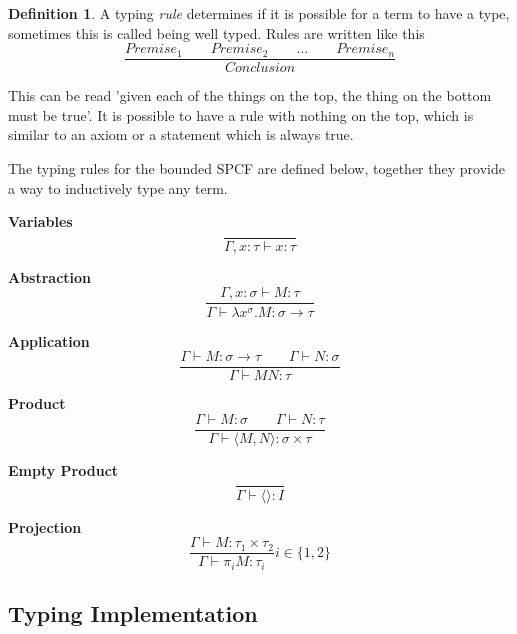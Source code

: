 \documentclass[12pt,a4paper]{report}
\theoremstyle{definition}
\newtheorem{definition}{Definition}[chapter]%
\theoremstyle{remark}
\begin{document}
\begin{definition}
    A typing \emph{rule} determines if it is possible for a term to have a type, sometimes this is called being well typed. Rules are written like this
    \[
    \frac{Premise_1 \quad\quad Premise_2 \quad\quad \ldots \quad\quad Premise_n}{Conclusion}
    \]

    This can be read 'given each of the things on the top, the thing on the bottom must be true'. It is possible to have a rule with nothing on the top, which is similar to an axiom or a statement which is always true.
\end{definition}

The typing rules for the bounded SPCF are defined below, together they provide a way to inductively type any term. 

\textbf{Variables}
\begin{equation}
    \frac{}{\Gamma, x:\tau \vdash x: \tau}
\end{equation}

\textbf{Abstraction}
\begin{equation}
    \frac{\Gamma, x:\sigma \vdash M : \tau}{\Gamma \vdash \lambda x^{\sigma}. M : \sigma \rightarrow \tau}
\end{equation}

\textbf{Application}
\begin{equation}
    \frac{\Gamma \vdash M : \sigma \rightarrow \tau \quad\quad \Gamma \vdash N : \sigma}{\Gamma \vdash MN : \tau}
\end{equation}

\textbf{Product}
\begin{equation}
    \frac{\Gamma \vdash M:\sigma \quad\quad \Gamma \vdash N:\tau}{\Gamma \vdash \langle M,N \rangle : \sigma \times \tau}
\end{equation}

\textbf{Empty Product}
\begin{equation}
    \frac{}{\Gamma \vdash \langle \rangle : I}
\end{equation}

\textbf{Projection}
\begin{equation}
    \frac{\Gamma \vdash M:\tau_1 \times \tau_2}{\Gamma \vdash \pi_i M: \tau_i} i \in \{1, 2\}
\end{equation}

\subsection{Typing Implementation}
\end{document}
